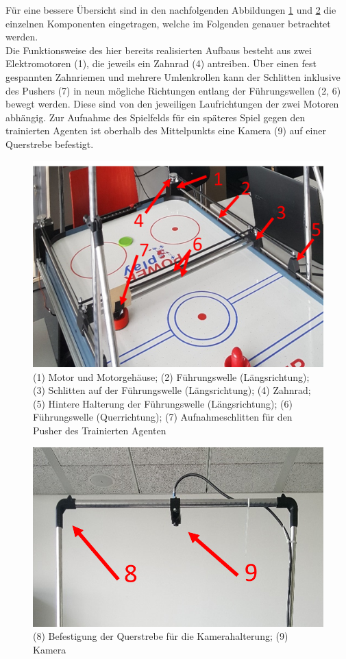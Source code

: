 Für eine bessere Übersicht sind in den nachfolgenden Abbildungen \ref{HW_Aufbau} und \ref{HW_Kamerahalterung} die einzelnen Komponenten eingetragen, welche im Folgenden genauer betrachtet werden.\\
Die Funktionsweise des hier bereits realisierten Aufbaus besteht aus zwei Elektromotoren (1), die jeweils ein Zahnrad (4) antreiben. Über einen fest gespannten Zahnriemen und mehrere Umlenkrollen kann der Schlitten inklusive des Pushers (7) in neun mögliche Richtungen entlang der Führungswellen (2, 6) bewegt werden. Diese sind von den jeweiligen Laufrichtungen der zwei Motoren abhängig. 
Zur Aufnahme des Spielfelds für ein späteres Spiel gegen den trainierten Agenten ist oberhalb des Mittelpunkts eine Kamera (9) auf einer Querstrebe befestigt.\\
\clearpage
\begin{figure}
\includegraphics[width=1\textwidth]{images/HW_Aufbau}
 \caption{(1) Motor und Motorgehäuse;
(2)	Führungswelle (Längsrichtung);
(3)	Schlitten auf der Führungswelle (Längsrichtung);
(4)	Zahnrad;
(5)	Hintere Halterung der Führungswelle (Längsrichtung);
(6)	Führungswelle (Querrichtung);
(7)	Aufnahmeschlitten für den Pusher des Trainierten Agenten
}
\label{HW_Aufbau}
\end{figure}

\begin{figure}
\includegraphics[width=1\textwidth]{images/HW_Kamerahalterung}
\caption[width=0.5\textwidth]{(8) Befestigung der Querstrebe für die Kamerahalterung; (9) Kamera}
\label{HW_Kamerahalterung}
\end{figure}
\clearpage

